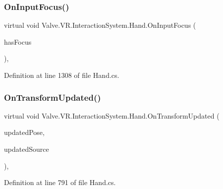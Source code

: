 \subsubsection{\texorpdfstring{OnInputFocus()}{OnInputFocus()}}
{\footnotesize\ttfamily virtual void Valve.\+V\+R.\+Interaction\+System.\+Hand.\+On\+Input\+Focus (\begin{DoxyParamCaption}\item[{bool}]{has\+Focus }\end{DoxyParamCaption})\hspace{0.3cm}{\ttfamily [protected]}, {\ttfamily [virtual]}}



Definition at line 1308 of file Hand.\+cs.

\mbox{\label{class_valve_1_1_v_r_1_1_interaction_system_1_1_hand_ad4f26820b32f5aada5ad753844351ece}} 
\subsubsection{\texorpdfstring{OnTransformUpdated()}{OnTransformUpdated()}}
{\footnotesize\ttfamily virtual void Valve.\+V\+R.\+Interaction\+System.\+Hand.\+On\+Transform\+Updated (\begin{DoxyParamCaption}\item[{\mbox{\hyperlink{class_valve_1_1_v_r_1_1_steam_v_r___behaviour___pose}{Steam\+V\+R\+\_\+\+Behaviour\+\_\+\+Pose}}}]{updated\+Pose,  }\item[{\mbox{\hyperlink{namespace_valve_1_1_v_r_a82e5bf501cc3aa155444ee3f0662853f}{Steam\+V\+R\+\_\+\+Input\+\_\+\+Sources}}}]{updated\+Source }\end{DoxyParamCaption})\hspace{0.3cm}{\ttfamily [protected]}, {\ttfamily [virtual]}}



Definition at line 791 of file Hand.\+cs.

\mbox{\label{class_valve_1_1_v_r_1_1_interaction_system_1_1_hand_a30924ebdc6a8c20f9109aaf38c7cfe46}} 
